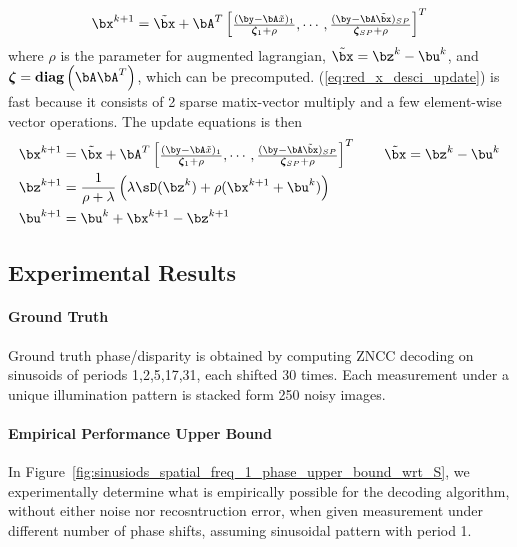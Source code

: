 \documentclass[../writeup.tex]{subfiles}
\begin{document}
\begin{align}
    \bx^{k+1} 
        = \tilde{\bx} + \bA^T \begin{bmatrix}
            \frac{(\by - \bA\tilde{x})_1}{\bzeta_1 + \rho},\cdots, \frac{(\by - \bA\tilde{\bx})_{SP}}{\bzeta_{SP} + \rho}
        \end{bmatrix}^T
    \label{eq:red_x_desci_update}
\end{align}
where $\rho$ is the parameter for augmented lagrangian, $\tilde{\bx} = \bz^k - \bu^k$, and $\bzeta = \diag \left(\bA\bA^T\right)$, which can be precomputed. (\ref{eq:red_x_desci_update}) is fast because it consists of 2 sparse matix-vector multiply and a few element-wise vector operations. The update equations is then
\begin{align} 
    \bx^{k+1}
        &= \tilde{\bx} + \bA^T \begin{bmatrix}
            \frac{(\by - \bA\tilde{x})_1}{\bzeta_1 + \rho},\cdots, \frac{(\by - \bA\tilde{\bx})_{SP}}{\bzeta_{SP} + \rho}
        \end{bmatrix}^T
        \qquad \tilde{\bx} = \bz^k - \bu^k \\
    \bz^{k+1}
        &= \frac{1}{\rho + \lambda} \left(
            \lambda \sD(\bz^{k}) + \rho ( \bx^{k+1} + \bu^k  )
        \right) \\
    \bu^{k+1}
        &= \bu^k + \bx^{k+1} - \bz^{k+1}
    \label{eq:red_admm_update_equations_fast_x_update}
\end{align}


\subsection{Experimental Results}

\paragraph{Ground Truth} Ground truth phase/disparity is obtained by computing ZNCC decoding on sinusoids of periods 1,2,5,17,31, each shifted 30 times. Each measurement under a unique illumination pattern is stacked form 250 noisy images. 

\paragraph{Empirical Performance Upper Bound} In Figure~\ref{fig:sinusiods_spatial_freq_1_phase_upper_bound_wrt_S}, we experimentally determine what is empirically possible for the decoding algorithm, without either noise nor recosntruction error, when given measurement under different number of phase shifts, assuming sinusoidal pattern with period 1.
\end{document}
